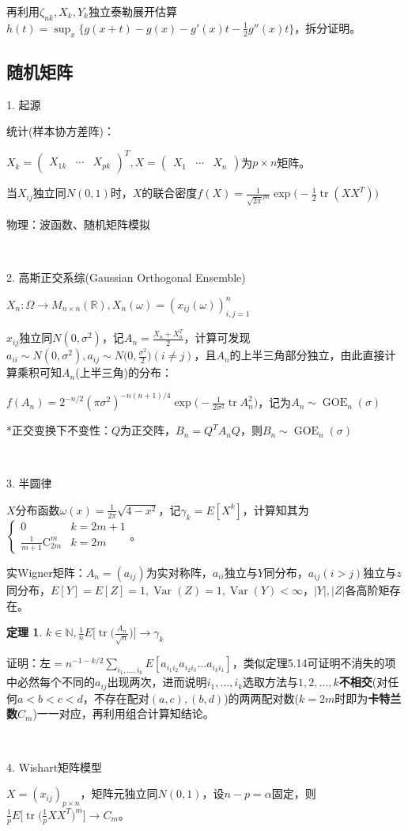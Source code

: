 \documentclass[a4paper,UTF8,fontset=windows]{ctexart}
\newtheorem{thm}{定理}[section]
\DeclareMathOperator{\GOE}{GOE}
\DeclareMathOperator{\Var}{Var}
\DeclareMathOperator{\tr}{tr}
\newcommand{\con}[1]{\stackrel{#1}{\longrightarrow}}
\begin{document}
再利用$\zeta_{nk},X_k,Y_k$独立泰勒展开估算$h(t)=\sup_x\{g(x+t)-g(x)-g'(x)t-\frac{1}{2}g''(x)t\}$，拆分证明。

\subsection{随机矩阵}
1. 起源

统计(样本协方差阵)：

$X_k=\begin{pmatrix}X_{1k}&\cdots&X_{pk}\end{pmatrix}^T,X=\begin{pmatrix}X_1&\cdots&X_n\end{pmatrix}$为$p\times n$矩阵。

当$X_{ij}$独立同$N(0,1)$时，$X$的联合密度$f(X)=\frac{1}{\sqrt{2\pi}^{pn}}\exp\bigg(-\frac{1}{2}\tr(XX^T)\bigg)$

物理：波函数、随机矩阵模拟

~

2. 高斯正交系综(Gaussian Orthogonal Ensemble)

$X_n:\Omega\longrightarrow M_{n\times n}(\mathbb{R}),X_n(\omega)=(x_{ij}(\omega))_{i,j=1}^n$

$x_{ij}$独立同$N(0,\sigma^2)$，记$A_n=\frac{X_n+X_n^T}{2}$，计算可发现$a_{ii}\sim N(0,\sigma^2),a_{ij}\sim N\bigg(0,\frac{\sigma^2}{2}\bigg)(i\ne j)$，且$A_n$的上半三角部分独立，由此直接计算乘积可知$A_n$(上半三角)的分布：

$f(A_n)=2^{-n/2}(\pi\sigma^2)^{-n(n+1)/4}\exp\bigg(-\frac{1}{2\sigma^2}\tr A_n^2\bigg)$，记为$A_n\sim\GOE_n(\sigma)$

*正交变换下不变性：$Q$为正交阵，$B_n=Q^TA_nQ$，则$B_n\sim\GOE_n(\sigma)$

~

3. 半圆律

$X$分布函数$\omega(x)=\frac{1}{2\pi}\sqrt{4-x^2}$，记$\gamma_k=E[X^k]$，计算知其为$\begin{cases}0&k=2m+1\\\frac{1}{m+1}\mathrm{C}_{2m}^m&k=2m\end{cases}$。

实Wigner矩阵：$A_n=(a_{ij})$为实对称阵，$a_{ii}$独立与$Y$同分布，$a_{ij}(i>j)$独立与$z$同分布，$E[Y]=E[Z]=1,\Var(Z)=1,\Var(Y)<\infty$，$|Y|,|Z|$各高阶矩存在。

\begin{thm}
$k\in\mathbb{N},\frac{1}{n}E\bigg[\tr\bigg(\frac{A_n}{\sqrt{n}}\bigg)\bigg]\con{}\gamma_k$
\end{thm}

证明：左$=n^{-1-k/2}\sum_{i_1,\dots,i_k}E[a_{i_1i_2}a_{i_2i_3}\dots a_{i_ki_1}]$，类似定理5.14可证明不消失的项中必然每个不同的$a_{ij}$出现两次，进而说明$i_1,\dots,i_k$选取方法与$1,2,\dots,k$\textbf{不相交}(对任何$a<b<c<d$，不存在配对$(a,c),(b,d)$)的两两配对数($k=2m$时即为\textbf{卡特兰数}$C_m$)一一对应，再利用组合计算知结论。

~

4. Wishart矩阵模型

$X=(x_{ij})_{p\times n}$，矩阵元独立同$N(0,1)$，设$n-p=\alpha$固定，则$\frac{1}{p}E\bigg[\tr\bigg(\frac{1}{p}XX^T\bigg)^m\bigg]\con{}C_m$。
\end{document}
